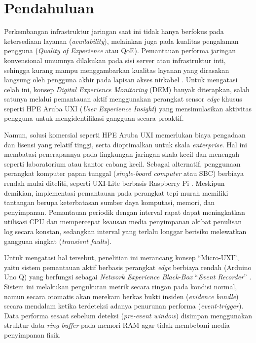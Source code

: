 \section{Pendahuluan}
\label{sec-pendahuluan}

Perkembangan infrastruktur jaringan saat ini tidak hanya berfokus pada ketersediaan layanan (\textit{availability}), melainkan juga pada kualitas pengalaman pengguna (\textit{Quality of Experience} atau QoE). Pemantauan performa jaringan konvensional umumnya dilakukan pada sisi server atau infrastruktur inti, sehingga kurang mampu menggambarkan kualitas layanan yang dirasakan langsung oleh pengguna akhir pada lapisan akses nirkabel \cite{barakabitze2020}. Untuk mengatasi celah ini, konsep \textit{Digital Experience Monitoring} (DEM) banyak diterapkan, salah satunya melalui pemantauan aktif menggunakan perangkat sensor \textit{edge} khusus seperti HPE Aruba UXI (\textit{User Experience Insight}) yang mensimulasikan aktivitas pengguna untuk mengidentifikasi gangguan secara proaktif.

Namun, solusi komersial seperti HPE Aruba UXI memerlukan biaya pengadaan dan lisensi yang relatif tinggi, serta dioptimalkan untuk skala \textit{enterprise}. Hal ini membatasi penerapannya pada lingkungan jaringan skala kecil dan menengah seperti laboratorium atau kantor cabang kecil. Sebagai alternatif, penggunaan perangkat komputer papan tunggal (\textit{single-board computer} atau SBC) berbiaya rendah mulai diteliti, seperti UXI-Lite berbasis Raspberry Pi \cite{baswara2026}. Meskipun demikian, implementasi pemantauan pada perangkat tepi murah memiliki tantangan berupa keterbatasan sumber daya komputasi, memori, dan penyimpanan. Pemantauan periodik dengan interval rapat dapat meningkatkan utilisasi CPU dan mempercepat keausan media penyimpanan akibat penulisan log secara konstan, sedangkan interval yang terlalu longgar berisiko melewatkan gangguan singkat (\textit{transient faults}).

Untuk mengatasi hal tersebut, penelitian ini merancang konsep ``Micro-UXI'', yaitu sistem pemantauan aktif berbasis perangkat \textit{edge} berbiaya rendah (Arduino Uno Q) yang berfungsi sebagai \textit{Network Experience Black-Box} ``\textit{Event Recorder}'' \cite{kucera2020}. Sistem ini melakukan pengukuran metrik secara ringan pada kondisi normal, namun secara otomatis akan merekam berkas bukti insiden (\textit{evidence bundle}) secara mendalam ketika terdeteksi adanya penurunan performa (\textit{event-trigger}). Data performa sesaat sebelum deteksi (\textit{pre-event window}) disimpan menggunakan struktur data \textit{ring buffer} pada memori RAM \cite{marwedel2021} agar tidak membebani media penyimpanan fisik.

